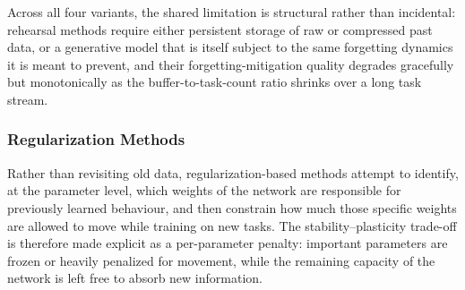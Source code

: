 Across all four variants, the shared limitation is structural rather than incidental: rehearsal methods require either persistent storage of raw or compressed past data, or a generative model that is itself subject to the same forgetting dynamics it is meant to prevent, and their forgetting-mitigation quality degrades gracefully but monotonically as the buffer-to-task-count ratio shrinks over a long task stream.

\subsubsection{Regularization Methods}

Rather than revisiting old data, regularization-based methods attempt to identify, at the parameter level, which weights of the network are responsible for previously learned behaviour, and then constrain how much those specific weights are allowed to move while training on new tasks. The stability--plasticity trade-off is therefore made explicit as a per-parameter penalty: important parameters are frozen or heavily penalized for movement, while the remaining capacity of the network is left free to absorb new information.

